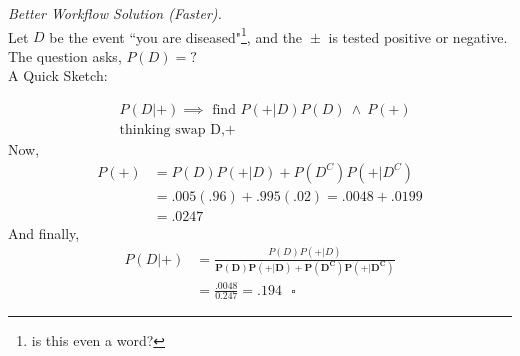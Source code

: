 \documentclass[12pt]{book}
\begin{document}
\newpage
\noindent \hypertarget{better workflow solution faster}{\textit{Better Workflow Solution (Faster). }} \\
Let $D$ be the event ``you are diseased"\footnote{is this even a word?}, and the $\boxed{\pm}$ is tested positive or negative.\\
The question asks, $P(D)=?$\\
A Quick Sketch:\\
\begin{center}
\end{center}
\begin{align*}
&P(D|+)\implies{\text{~find~}}P(+|D)P(D) ~\land~P(+)	\\
&\text{thinking swap D,+}
\end{align*}
Now,
\begin{align*}
P(+)&=\boxed{P(D)P(+|D)}+P(D^C)P(+|D^C)\\
&=\boxed{.005(.96)}+.995(.02)=\boxed{.0048}+.0199\\
&=\mathbf{.0247}
\end{align*}
And finally,
\begin{align*}
P(D|+)&=\frac{\boxed{P(D)P(+|D)}}{\mathbf{P(D)P(+|D)+P(D^C)P(+|D^C)}}\\
&=\frac{\boxed{.0048}}{\mathbf{0.247}}=.194~~~\square
\end{align*}
\newpage
\end{document}
